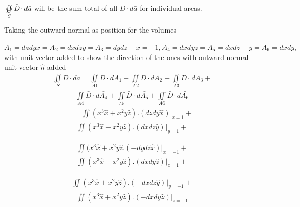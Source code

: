 \begin{exmp}
	$\oiint\limits_S\bar{D}\cdot d\bar{a}$ will be the sum total of all ${D}\cdot d\bar{a}$ for individual areas.
	
	Taking the outward normal as position for the volumes
	
	$A_1 = dzdyx=  A_2 = dxdzy= A_3 = dydz-x= -1, A_4 = dxdyz= A_5 = dxdz-y= A_6 = dxdy, $\\ with unit vector added to show the direction of the ones with outward normal unit vector $\hat{n}$ added
	\begin{align*}
			\iint\limits_S\bar{D}\cdot d\bar{a} = \iint\limits_{A1}\bar{D}\cdot d\bar{A_1} +\iint\limits_{A2}\bar{D}\cdot d\bar{A_2}+ \iint\limits_{A3}\bar{D}\cdot d\bar{A_3}+ 
		\end{align*}
	\begin{align*}
			\iint\limits_{A4}\bar{D}\cdot d\bar{A_4}+ \iint\limits_{A5}\bar{D}\cdot d\bar{A_5}+ \iint\limits_{A6}\bar{D}\cdot d\bar{A_6}   
		\end{align*}
	\begin{align*}
			=\iint\limits(x^3 \hat{x}+ x^2y\hat{z}).(dzdy\hat{x})|_{x=1}+
		\end{align*}
	\begin{align*}
			\iint\limits(x^3 \hat{x}+ x^2y\hat{z}).(dxdz\hat{y})|_{y=1}+
		\end{align*}
	
	\begin{align*}
			\iint\limits(x^3 \hat{x}+ x^2y\hat{z}.(-dydz\hat{x})|_{x=-1}+
		\end{align*}
	\begin{align*}
			\iint\limits(x^3 \hat{x}+ x^2y\hat{z}).(dxdy \hat{z})|_{z=1}+
		\end{align*}
	
	\begin{align*}
			\iint\limits(x^3 \hat{x}+ x^2y\hat{z}).(-dxdz\hat{y})|_{y=-1}+
		\end{align*}
	\begin{align*}
			\iint\limits(x^3 \hat{x}+ x^2y\hat{z}).(-dxdy\hat{z})|_{z=-1} 
		\end{align*}
	

\end{exmp}
